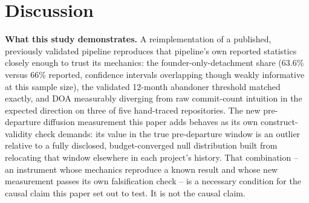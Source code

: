 \documentclass[11pt,letterpaper]{article}
\begin{document}
\section{Discussion}

\textbf{What this study demonstrates.} A reimplementation of a published, previously validated pipeline reproduces that pipeline's own reported statistics closely enough to trust its mechanics: the founder-only-detachment share (63.6\% versus 66\% reported, confidence intervals overlapping though weakly informative at this sample size), the validated 12-month abandoner threshold matched exactly, and DOA measurably diverging from raw commit-count intuition in the expected direction on three of five hand-traced repositories. The new pre-departure diffusion measurement this paper adds behaves as its own construct-validity check demands: its value in the true pre-departure window is an outlier relative to a fully disclosed, budget-converged null distribution built from relocating that window elsewhere in each project's history. That combination -- an instrument whose mechanics reproduce a known result and whose new measurement passes its own falsification check -- is a necessary condition for the causal claim this paper set out to test. It is not the causal claim.
\end{document}
